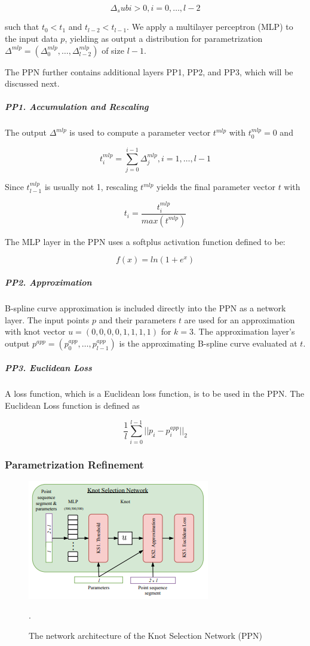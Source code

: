 $$ \Delta_sub{i} > 0, i = 0, \ldots, l - 2 $$

such that $t_{0} < t_{1}$ and $t_{l - 2} < t_{l - 1}$. We apply a multilayer perceptron (MLP) to the input data $p$, yielding as output a distribution for parametrization $\Delta^{mlp} = (\Delta^{mlp}_{0}, \ldots, \Delta^{mlp}_{l - 2})$ of size $l - 1$.

The PPN further contains additional layers PP1, PP2, and PP3, which will be discussed next.

\subparagraph{PP1. Accumulation and Rescaling}
The output $\Delta^{mlp}$ is used to compute a parameter vector $t^{mlp}$ with $t^{mlp}_{0} = 0$ and

$$ t^{mlp}_{i} = \sum_{j = 0}^{i - 1}\Delta^{mlp}_{j}, i = 1, \ldots, l - 1 $$

Since $t^{mlp}_{l - 1}$ is usually not 1, rescaling $t^{mlp}$ yields the final parameter vector $t$ with

$$ t_{i} = \frac{t^{mlp}_{i}}{max(t^{mlp})} $$

The MLP layer in the PPN uses a softplus activation function defined to be:

$$ f(x) = ln(1 + e^{x}) $$

\subparagraph{PP2. Approximation}
B-spline curve approximation is included directly into the PPN as a network layer. The input points $p$ and their parameters $t$ are used for an approximation with knot vector $u = (0, 0, 0, 0, 1, 1, 1, 1)$ for $k = 3$. The approximation layer's output $p^{app} = (p^{app}_{0}, \ldots, p^{app}_{l - 1})$ is the approximating B-spline curve evaluated at $t$.

\subparagraph{PP3. Euclidean Loss}
A loss function, which is a Euclidean loss function, is to be used in the PPN. The Euclidean Loss function is defined as

\begin{equation}
\frac{1}{l}\sum_{i= 0}^{l - 1}\lvert\rvert p_{i} - p^{app}_{i} \lvert\rvert_{2} \label{eq:euclideanloss}
\end{equation}

\subsubsection{Parametrization Refinement}

\begin{figure}[h]
	\centering
	\includegraphics[scale=0.75]{images/chap05-methodology/ksn.png}
	\caption{The network architecture of the Knot Selection Network (PPN)}.
	\label{fig:ksn}
\end{figure}

